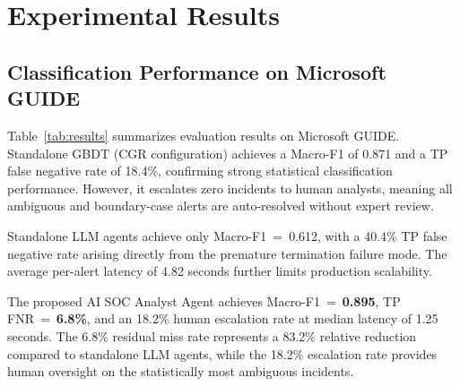 \section{Experimental Results}
\label{sec:results}

\subsection{Classification Performance on Microsoft GUIDE}

Table~\ref{tab:results} summarizes evaluation results on Microsoft GUIDE.
Standalone GBDT (CGR configuration) achieves a Macro-F1 of 0.871 and a TP
false negative rate of 18.4\%, confirming strong statistical classification
performance. However, it escalates zero incidents to human analysts, meaning
all ambiguous and boundary-case alerts are auto-resolved without expert review.

Standalone LLM agents achieve only Macro-F1~=~0.612, with a 40.4\% TP false
negative rate arising directly from the premature termination failure mode. The
average per-alert latency of 4.82 seconds further limits production scalability.

The proposed AI SOC Analyst Agent achieves Macro-F1~=~\textbf{0.895}, TP
FNR~=~\textbf{6.8\%}, and an 18.2\% human escalation rate at median latency of
1.25 seconds. The 6.8\% residual miss rate represents a 83.2\% relative reduction
compared to standalone LLM agents, while the 18.2\% escalation rate provides
human oversight on the statistically most ambiguous incidents.

\begin{table}[t]
\caption{Evaluation Results on Microsoft GUIDE and ExCyTIn-Bench}
\label{tab:results}
\centering
{}
\end{table}

